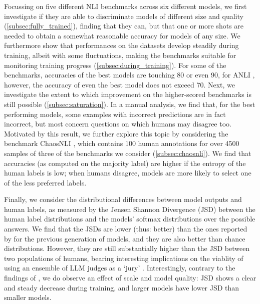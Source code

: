 Focussing on five different NLI benchmarks across six different models, we first investigate if they are able to discriminate models of different size and quality (\cref{subsec:fully_trained}), finding that they can, but that one or more shots are needed to obtain a somewhat reasonable accuracy for models of any size.
We furthermore show that performances on the datasets develop steadily during training, albeit with some fluctuations, making the benchmarks suitable for monitoring training progress (\cref{subsec:during_training}).
For some of the benchmarks, accuracies of the best models are touching 80 or even 90, for ANLI \citep{nie-etal-2020-adversarial}, however, the accuracy of even the best model does not exceed 70.
Next, we investigate the extent to which improvement on the higher-scored benchmarks is still possible (\cref{subsec:saturation}).
In a manual analysis, we find that, for the best performing models, some examples with incorrect predictions are in fact incorrect, but most concern questions on which humans may disagree too.
Motivated by this result, we further explore this topic by considering the benchmark ChaosNLI \citep{nie-etal-2020-learn}, which contains 100 human annotations for over 4500 samples of three of the benchmarks we consider (\cref{subsec:chaosnli}).
We find that accuracies (as computed on the majority label) are higher if the entropy of the human labels is low; when humans disagree, models are more likely to select one of the less preferred labels.

Finally, we consider the distributional differences between model outputs and human labels, as measured by the Jensen Shannon Divergence (JSD) between the human label distributions and the models' softmax distributions over the possible answers.
We find that the JSDs are lower (thus: better) than the ones reported by \citet{nie-etal-2020-learn} for the previous generation of models, and they are also better than chance distributions. 
However, they are still substantially higher than the JSD between two populations of humans, bearing interesting implications on the viablity of using an ensemble of LLM judges as a `jury' \citep[e.g.][]{verga2024replacing}.
Interestingly, contrary to the findings of \citet{nie-etal-2020-learn}, we do observe an effect of scale and model quality: JSD shows a clear and steady decrease during training, and larger models have lower JSD than smaller models.

